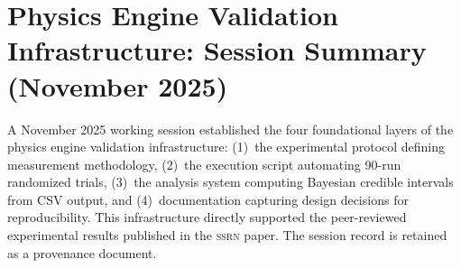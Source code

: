 
\section*{Physics Engine Validation Infrastructure: Session Summary (November 2025)}

A November 2025 working session established the four foundational layers of the
physics engine validation infrastructure: (1)~the experimental protocol defining
measurement methodology, (2)~the execution script automating 90-run randomized
trials, (3)~the analysis system computing Bayesian credible intervals from CSV
output, and (4)~documentation capturing design decisions for reproducibility.
This infrastructure directly supported the peer-reviewed experimental results
published in the \textsc{ssrn} paper. The session record is retained as a
provenance document.
